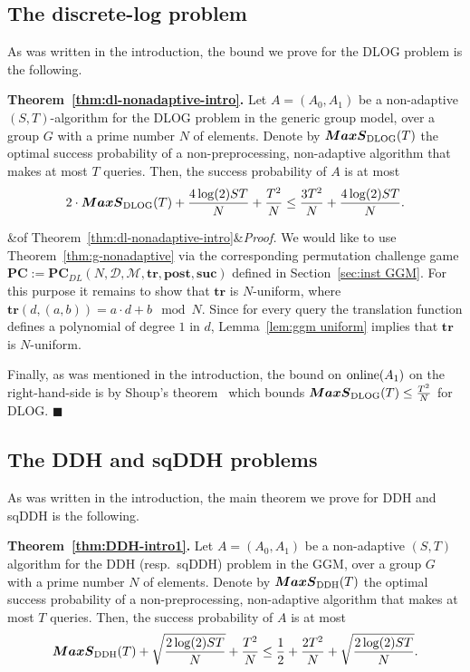 \documentclass[11pt]{article}
\renewenvironment{proof}[1][]
    {\noindent
       \ifx&#1&{\it Proof.}
       \else{\it Proof ({#1}).}
       \fi}{\hfill $\blacksquare$}
\newcommand{\SECS}{{\mathcal{D}}}
\newcommand{\secv}{{d}}
\newcommand{\SUC}{\boldsymbol{suc}}
\newcommand{\TR}{\boldsymbol{tr}}
\newcommand{\POST}{\boldsymbol{post}}
\newcommand{\PC}{\boldsymbol{PC}}
\newcommand{\MAXS}{\boldsymbol{MaxS}}
\begin{document}
\subsection{The discrete-log problem}

As was written in the introduction, the bound we prove for the DLOG problem is the following.


\medskip \noindent \textbf{Theorem~\ref{thm:dl-nonadaptive-intro}.}
Let $A=(A_0,A_1)$ be a non-adaptive $(S,T)$-algorithm for the DLOG problem in the generic group model, over a group $G$ with a prime number $N$ of elements. Denote by $\MAXS_{\textup{DLOG}}(T)$ 
the optimal success probability of a non-preprocessing, non-adaptive algorithm that makes at most $T$ queries.
Then, the success probability of $A$ is at most
$$
2\cdot \MAXS_{\textup{DLOG}}(T) + \frac{4\log(2) ST}{N} + \frac{T^2}{N} \leq
\frac{3T^2 }{N}  + \frac{4\log(2) ST}{N}.
$$

\begin{proof}[of Theorem~\ref{thm:dl-nonadaptive-intro}]
We would like to use Theorem~\ref{thm:g-nonadaptive} via the corresponding permutation challenge game
$\PC := \PC_{DL}(N,\SECS,\mathcal{M},\TR,\POST,\SUC)$
defined in Section~\ref{sec:inst GGM}. For this purpose it remains to show that 
$\TR$ is $N$-uniform, 
where $\TR(d,(a,b)) = a \cdot d + b \mod N$.
Since for every query the translation function defines a polynomial of degree $1$ in $\secv$,
Lemma~\ref{lem:ggm uniform} implies that $\TR$ is $N$-uniform.

Finally, as was mentioned in the introduction, the bound on $\textup{online}(A_1)$ on the right-hand-side is by Shoup's theorem~\cite{Shoup97} which bounds $\MAXS_{\textup{DLOG}}(T) \leq \frac{T^2}{N}$ for DLOG.
\end{proof}

\subsection{The DDH and sqDDH problems}

As was written in the introduction, the main theorem we prove for DDH and sqDDH is the following.

\medskip \noindent \textbf{Theorem~\ref{thm:DDH-intro1}.} Let $A=(A_0,A_1)$ be a non-adaptive $(S,T)$ algorithm for the DDH (resp.~sqDDH) problem in the GGM, over a group $G$ with a prime number $N$ of elements. Denote by $\MAXS_{\textup{DDH}}(T)$ the optimal success probability of a non-preprocessing, non-adaptive algorithm that makes at most $T$ queries. Then, the success probability of $A$ is at most
$$
\MAXS_{\textup{DDH}}(T) + \sqrt{\frac{2\log(2) ST}{N}} + \frac{T^2}{N} \leq
\frac{1}{2}+ \frac{2T^2}{N}  + \sqrt{\frac{2\log(2)ST}{N}}.
$$
\end{document}
